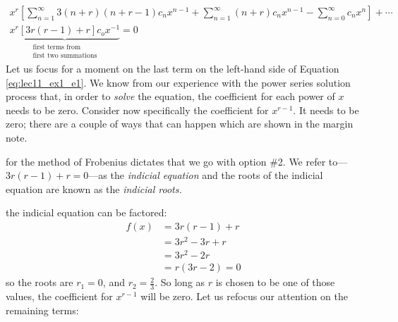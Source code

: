 \begin{multline}
x^r \left[\sum\limits_{n=1}^{\infty} 3(n+r)(n+r-1)c_nx^{n-1} + \sum\limits_{n=1}^{\infty} (n+r)c_nx^{n-1} - \sum\limits_{n=0}^{\infty}c_nx^n \right] + \cdots \\
\underbrace{x^r\left[3r(r-1) + r \right]c_ox^{-1}}_{\substack{\text{first terms from} \\ \text{first two summations}}} = 0
\label{eq:lec11_ex1_e1}
\end{multline}
Let us focus for a moment on the last term on the left-hand side of Equation \ref{eq:lec11_ex1_e1}.  We know from our experience with the power series solution process that, in order to \emph{solve} the equation, the coefficient for each power of $x$ needs to be zero.  Consider now specifically the coefficient for $x^{r-1}$.  It needs to be zero; there are a couple of ways that can happen which are shown in the margin note.

 for the method of Frobenius dictates that we go with option \#2.  We refer to---$3r(r-1)+r = 0$---as the \emph{indicial equation} and the roots of the indicial equation are known as the \emph{indicial roots.} 

 the indicial equation can be factored:
\begin{align*}
f(x) &= 3r(r-1)+r \\
&=3r^2-3r+r \\
&=3r^2-2r \\
&=r(3r-2) = 0
\end{align*}
so the roots are $r_1=0$, and $r_2 = \frac{2}{3}$. So long as $r$ is chosen to be one of those values, the coefficient for $x^{r-1}$ will be zero.  Let us refocus our attention on the remaining terms:

